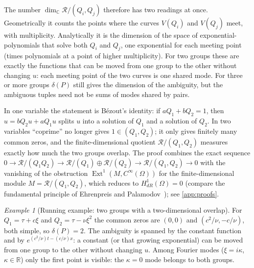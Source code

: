 \documentclass[11pt]{article}
\theoremstyle{plain}
\theoremstyle{definition}
\theoremstyle{remark}
\newtheorem{example}[theorem]{Example}
\newcommand{\R}{\mathbb{R}}
\newcommand{\C}{\mathbb{C}}
\newcommand{\ring}{\mathcal{R}}            %
\newcommand{\Var}{V}                        %
\newcommand{\deltaP}{\delta(P)}             %
\begin{document}
The number $\dim_\C\ring/(Q_i,Q_j)$ therefore has two readings at once. Geometrically it counts the points where
the curves $\Var(Q_i)$ and $\Var(Q_j)$ meet, with multiplicity. Analytically it is the dimension of the space of
exponential-polynomials that solve both $Q_i$ and $Q_j$, one exponential for each meeting point (times polynomials at a
point of higher multiplicity). For two groups these are exactly the functions that can be moved from one group to the
other without changing $u$: each meeting point of the two curves is one shared mode. For three or more groups $\deltaP$
still gives the dimension of the ambiguity, but the ambiguous tuples need not be sums of modes shared by pairs.

In one variable the statement is B\'ezout's identity: if $aQ_1+bQ_2=1$, then
$u=bQ_2u+aQ_1u$ splits $u$ into a solution of $Q_1$ and a solution of $Q_2$. In two variables
``coprime'' no longer gives $1\in(Q_1,Q_2)$; it only gives finitely many common zeros, and the
finite-dimensional quotient $\ring/(Q_1,Q_2)$ measures exactly how much the two groups overlap. The
proof combines the exact sequence
$0\to\ring/(Q_1Q_2)\to\ring/(Q_1)\oplus\ring/(Q_2)\to\ring/(Q_1,Q_2)\to0$ with the vanishing of the obstruction
$\operatorname{Ext}^1(M,C^\infty(\Omega))$ for the finite-dimensional module $M=\ring/(Q_1,Q_2)$, which reduces to
$H^1_{dR}(\Omega)=0$ (compare the fundamental principle of Ehrenpreis and Palamodov~\cite{Ehr70,Pal70});
see \cref{app:proofs}.

\begin{example}[Running example: two groups with a two-dimensional overlap]\label{ex:tpd-factor}
For $Q_1=\tau+c\xi$ and $Q_2=\tau-\nu\xi^2$ the common zeros are $(0,0)$ and $(c^2/\nu,-c/\nu)$,
both simple, so $\deltaP=2$. The ambiguity is spanned by the constant function and by
$e^{(c^2/\nu)t-(c/\nu)x}$: a constant (or that growing exponential) can be moved from one group to
the other without changing $u$. Among Fourier modes ($\xi=i\kappa$, $\kappa\in\R$) only the
first point is visible: the $\kappa=0$ mode belongs to both groups.
\end{example}
\end{document}
